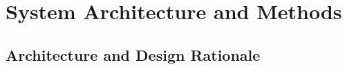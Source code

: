 \documentclass[conference]{IEEEtran}
\begin{document}


\section{System Architecture and Methods}
\subsection{Architecture and Design Rationale}
\end{document}
